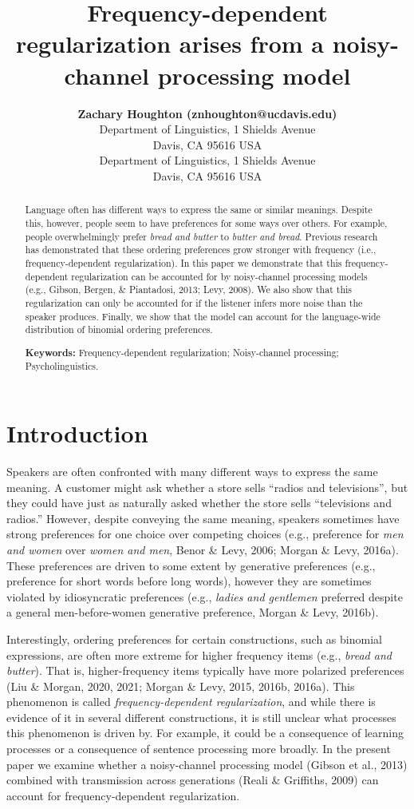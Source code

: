 \documentclass[10pt, letterpaper]{article}
\title{Frequency-dependent regularization arises from a noisy-channel
processing model}
\author{{\large \bf Zachary Houghton (znhoughton@ucdavis.edu)} \\ Department of Linguistics, 1 Shields Avenue \\ Davis, CA 95616 USA \AND {\large \bf Emily Morgan (eimorgan@ucdavis.edu)} \\ Department of Linguistics, 1 Shields Avenue \\ Davis, CA 95616 USA}
\begin{document}
\maketitle

\begin{abstract}
Language often has different ways to express the same or similar
meanings. Despite this, however, people seem to have preferences for
some ways over others. For example, people overwhelmingly prefer
\emph{bread and butter} to \emph{butter and bread}. Previous research
has demonstrated that these ordering preferences grow stronger with
frequency (i.e., frequency-dependent regularization). In this paper we
demonstrate that this frequency-dependent regularization can be
accounted for by noisy-channel processing models (e.g., Gibson, Bergen,
\& Piantadosi, 2013; Levy, 2008). We also show that this regularization
can only be accounted for if the listener infers more noise than the
speaker produces. Finally, we show that the model can account for the
language-wide distribution of binomial ordering preferences.

\textbf{Keywords:}
Frequency-dependent regularization; Noisy-channel processing;
Psycholinguistics.
\end{abstract}

\hypertarget{introduction}{%
\section{Introduction}\label{introduction}}

Speakers are often confronted with many different ways to express the
same meaning. A customer might ask whether a store sells ``radios and
televisions'', but they could have just as naturally asked whether the
store sells ``televisions and radios.'' However, despite conveying the
same meaning, speakers sometimes have strong preferences for one choice
over competing choices (e.g., preference for \emph{men and women} over
\emph{women and men}, Benor \& Levy, 2006; Morgan \& Levy, 2016a). These
preferences are driven to some extent by generative preferences (e.g.,
preference for short words before long words), however they are
sometimes violated by idiosyncratic preferences (e.g., \emph{ladies and
gentlemen} preferred despite a general men-before-women generative
preference, Morgan \& Levy, 2016b).

Interestingly, ordering preferences for certain constructions, such as
binomial expressions, are often more extreme for higher frequency items
(e.g., \emph{bread and butter}). That is, higher-frequency items
typically have more polarized preferences (Liu \& Morgan, 2020, 2021;
Morgan \& Levy, 2015, 2016b, 2016a). This phenomenon is called
\emph{frequency-dependent regularization}, and while there is evidence
of it in several different constructions, it is still unclear what
processes this phenomenon is driven by. For example, it could be a
consequence of learning processes or a consequence of sentence
processing more broadly. In the present paper we examine whether a
noisy-channel processing model (Gibson et al., 2013) combined with
transmission across generations (Reali \& Griffiths, 2009) can account
for frequency-dependent regularization.
\end{document}
